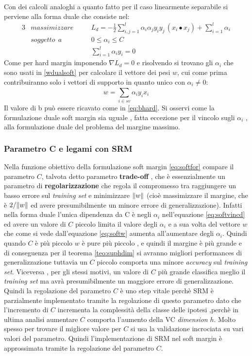 Con dei calcoli analoghi a quanto fatto per il caso linearmente separabile si perviene alla forma duale che consiste nel:
\begin{alignat}{3}
\label{eq:softford}
&massimizzare \quad&&L_{d} = - \frac{1}{2} \sum_{i,j = 1}^{l}\alpha_{i}\alpha_{j}y_{i}y_{j}\,(x_{i} \bullet x_{j}) + \sum_{i=1}^{l}\alpha_{i} \\
\label{eq:softvincd}
&soggetto \:\:a &&0 \leq \alpha_i \leq C \qquad \qquad \\
\label{eq:softvind2}
&\:&&\sum_{i=1}^{l} \alpha_i y_i = 0 
\end{alignat}
Come per hard margin imponendo $\nabla L_d = 0$ e risolvendo si trovano gli $\alpha_i$ che sono usati in \ref{wdualsoft} per calcolare il vettore dei pesi $w$, cui come prima contribuiranno solo i vettori di supporto in quanto unico con $\alpha_i \neq 0$:
\begin{equation}
\label{eq:softw}
w = \sum_{i \in sv}^{}\alpha_iy_ix_i
\end{equation}
Il valore di b può essere ricavato come in \eqref{eq:bhard}.
Si osservi come la formulazione duale soft margin sia uguale , fatta eccezione per il vincolo sugli $\alpha_i$ , alla formulazione duale del problema del margine massimo. 

\subsubsection{Parametro C e legami con SRM}
\label{subsub:srmsoft}
Nella funzione obiettivo della formulazione soft margin \eqref{eq:softfor} compare il parametro $C$, talvota detto parametro \textbf{trade-off} , che è essenzialmente un parametro di \textbf{regolarizzazione} che regola il compromesso tra raggiungere un basso errore sul \textit{training set} e minimizzare $\lVert w\rVert$ (cioè massimizzare il margine, che è $2/\lVert w\rVert$ ed avere presumibilmente un minore errore di generalizzazione). Infatti nella forma duale l'unica dipendenza da C è negli $\alpha_i$ nell'equazione \eqref{eq:softvincd} ed avere un valore di $C$ piccolo limita il valore degli $\alpha_i$ e a sua volta del vettore $w$ che come si vede dall'equazione \eqref{eq:softw} aumenta all'aumentare degli $\alpha_i$. Quindi quando $C$ è più piccolo $w$ è pure più piccolo , e quindi il margine è più grande e di conseguenza per il teorema \ref{teo:suphdim} si avranno migliori performances di generalizzazione tuttavia un $C$ piccolo  comporta una minore \textit{accuracy} sul \textit{training set}. Viceversa , per gli stessi motivi, un valore di $C$ più grande classifica meglio il \textit{training set} ma avrà presumibilmente un maggiore errore di generalizzazione. Quindi la regolazione del parametro $C$ è uno step vitale perchè \ac{SRM} è parzialmente implementato tramite la regolazione di questo parametro dato che l'incremento di $C$ incrementa la complessità della classe delle ipotesi ,perchè in ultima analisi aumentare $C$ comporta l'aumento della \ac{VC} \textit{dimension} $h$. Molto spesso per trovare il migliore valore per $C$ si usa la validazione incrociata su vari valori del parametro. Quindi l'implementazione di \ac{SRM} nel soft margin è approssimata tramite la regolazione del parametro $C$.

